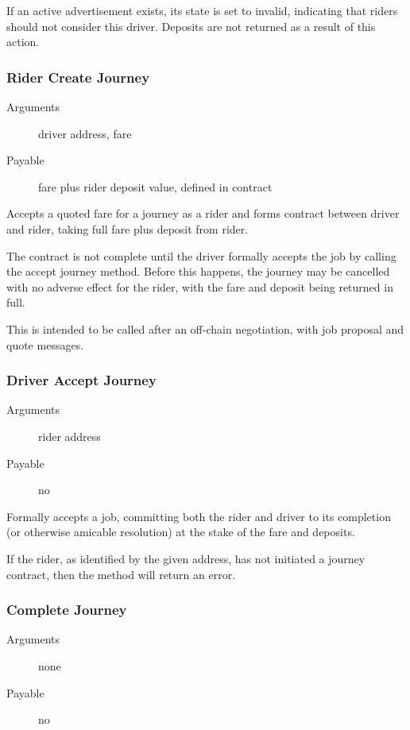 If an active advertisement exists, its state is set to invalid, indicating that riders should not consider this driver. Deposits are not returned as a result of this action.

\subsubsection{Rider Create Journey}

\begin{description}
	\item [Arguments] driver address, fare
	\item [Payable] fare plus rider deposit value, defined in contract
\end{description}

Accepts a quoted fare for a journey as a rider and forms contract between driver and rider, taking full fare plus deposit from rider.

The contract is not complete until the driver formally accepts the job by calling the accept journey method. Before this happens, the journey may be cancelled with no adverse effect for the rider, with the fare and deposit being returned in full.

This is intended to be called after an off-chain negotiation, with job proposal and quote messages.

\subsubsection{Driver Accept Journey}

\begin{description}
	\item [Arguments] rider address
	\item [Payable] no
\end{description}

Formally accepts a job, committing both the rider and driver to its completion (or otherwise amicable resolution) at the stake of the fare and deposits.

If the rider, as identified by the given address, has not initiated a journey contract, then the method will return an error.

\subsubsection{Complete Journey}

\begin{description}
	\item [Arguments] none
	\item [Payable] no
\end{description}

